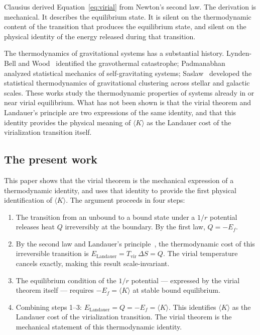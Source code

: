 \documentclass[12pt,a4paper]{article}
\begin{document}
Clausius derived Equation~\ref{eq:virial} from Newton's second law. The
derivation is mechanical. It describes the equilibrium state. It is silent
on the thermodynamic content of the transition that produces the
equilibrium state, and silent on the physical identity of the energy
released during that transition.

The thermodynamics of gravitational systems has a substantial history.
Lynden-Bell and Wood~\citep{LyndenBell1968} identified the gravothermal
catastrophe; Padmanabhan~\citep{Padmanabhan1990} analyzed statistical
mechanics of self-gravitating systems; Saslaw~\citep{Saslaw1985} developed
the statistical thermodynamics of gravitational clustering across stellar
and galactic scales. These works study the thermodynamic
properties of systems already in or near virial equilibrium. What has not
been shown is that the virial theorem and Landauer's principle are two
expressions of the same identity, and that this identity provides the
physical meaning of $\langle K \rangle$ as the Landauer cost of the
virialization transition itself.

\subsection{The present work}

This paper shows that the virial theorem is the mechanical expression of a
thermodynamic identity, and uses that identity to provide the first
physical identification of $\langle K \rangle$. The argument proceeds in
four steps:

\begin{enumerate}
\item The transition from an unbound to a bound state under a $1/r$
potential releases heat $Q$ irreversibly at the boundary. By the first law,
$Q = -E_f$.
\item By the second law and Landauer's principle~\citep{Landauer1961},
the thermodynamic cost of this irreversible transition is
$E_\mathrm{Landauer} = T_\mathrm{vir}\,\Delta S = Q$. The virial
temperature cancels exactly, making this result scale-invariant.
\item The equilibrium condition of the $1/r$ potential --- expressed by
the virial theorem itself --- requires $-E_f = \langle K \rangle$ at
stable bound equilibrium.
\item Combining steps 1--3: $E_\mathrm{Landauer} = Q = -E_f = \langle K \rangle$.
This identifies $\langle K \rangle$ as the Landauer cost of the
virialization transition. The virial theorem is the mechanical statement
of this thermodynamic identity.
\end{enumerate}
\end{document}
